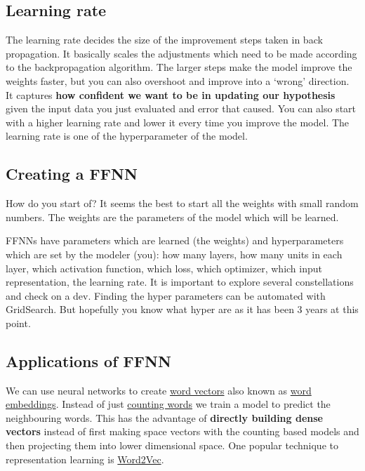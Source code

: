 \documentclass[
  11pt,
  british,
]{article}
\begin{document}
\hypertarget{learning-rate}{%
\subsection{Learning rate}\label{learning-rate}}

The learning rate decides the size of the improvement steps taken in
back propagation. It basically scales the adjustments which need to be
made according to the backpropagation algorithm. The larger steps make
the model improve the weights faster, but you can also overshoot and
improve into a `wrong' direction. It captures \textbf{how confident we
want to be in updating our hypothesis} given the input data you just
evaluated and error that caused. You can also start with a higher
learning rate and lower it every time you improve the model. The
learning rate is one of the hyperparameter of the model.

\hypertarget{creating-a-ffnn}{%
\subsection{Creating a FFNN}\label{creating-a-ffnn}}

How do you start of? It seems the best to start all the weights with
small random numbers. The weights are the parameters of the model which
will be learned.

FFNNs have parameters which are learned (the weights) and
hyperparameters which are set by the modeler (you): how many layers, how
many units in each layer, which activation function, which loss, which
optimizer, which input representation, the learning rate. It is
important to explore several constellations and check on a dev. Finding
the hyper parameters can be automated with GridSearch. But hopefully you
know what hyper are as it has been 3 years at this point.

\hypertarget{applications-of-ffnn}{%
\subsection{Applications of FFNN}\label{applications-of-ffnn}}

We can use neural networks to create
\href{../Semantic-Similarity/Vector\%20semantics.md}{word vectors} also
known as \href{../Semantic-Similarity/Embeddings.md}{word embeddings}.
Instead of just \href{../Semantic-Similarity/Co-occurrence.md}{counting
words} we train a model to predict the neighbouring words. This has the
advantage of \textbf{directly building dense vectors} instead of first
making space vectors with the counting based models and then projecting
them into lower dimensional space. One popular technique to
representation learning is
\href{../Semantic-Similarity/Word2Vec.md}{Word2Vec}.
\end{document}
